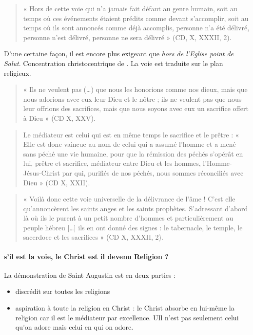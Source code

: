   \begin{quote}
      « Hors de cette voie qui n’a jamais fait défaut au genre humain, soit au temps où ces événements étaient prédits comme devant s’accomplir, soit au temps où ils sont annoncés comme déjà accomplis, personne n’a été délivré, personne n’est délivré, personne ne sera délivré » (CD, X, XXXII, 2). 
  \end{quote}
  
  D'une certaine façon, il est encore plus exigeant que \textit{hors de l'Eglise point de Salut}. Concentration christocentrique de \CD. La voie est traduite sur le plan religieux.
  

\begin{quote}
     « Ils ne veulent pas (…) que nous les honorions comme nos dieux, mais que nous adorions avec eux leur Dieu et le nôtre ; ils ne veulent pas que nous leur offrions des sacrifices, mais que nous soyons avec eux un sacrifice offert à Dieu » (CD X, XXV). 
\end{quote}


\begin{quote}
    Le médiateur est celui qui est en même temps le sacrifice et le prêtre : « Elle est donc vaincue au nom de celui qui a assumé l’homme et a mené sans péché une vie humaine, pour que la rémission des péchés s’opérât en lui, prêtre et sacrifice, médiateur entre Dieu et les hommes, l’Homme-Jésus-Christ  par qui, purifiés de nos péchés, nous sommes réconciliés avec Dieu » (CD X, XXII). 
\end{quote}
\begin{quote}
      « Voilà donc cette voie universelle de la délivrance de l’âme ! C’est elle qu’annoncèrent les saints anges et les saints prophètes. S’adressant d’abord là où ils le purent à un petit nombre d’hommes et particulièrement au peuple hébreu […] ils en ont donné des signes : le tabernacle, le temple, le sacerdoce et les sacrifices » (CD X, XXXII, 2). 
  \end{quote}
  \paragraph{s'il est la voie, le Christ est il devenu Religion ?}
  
 
  
  La démonstration de Saint Augustin est en deux parties : 
  \begin{itemize}
      \item   discrédit sur toutes les religions
  \item aspiration à toute la religion en Christ : le Christ absorbe en lui-même la religion car il est le médiateur par excellence. UIl n'est pas seulement celui qu'on adore mais celui en qui on adore.
  \end{itemize}

